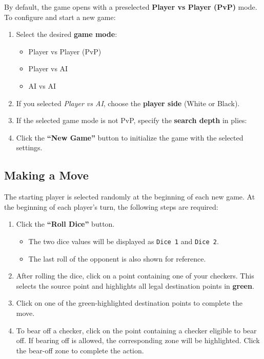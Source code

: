 By default, the game opens with a preselected \textbf{Player vs Player (PvP)} mode. To configure and start a new game:

\begin{enumerate}
    \item Select the desired \textbf{game mode}:
    \begin{itemize}
        \item Player vs Player (PvP)
        \item Player vs AI
        \item AI vs AI
    \end{itemize}

    \item If you selected \emph{Player vs AI}, choose the \textbf{player side} (White or Black).

    \item If the selected game mode is not PvP, specify the \textbf{search depth} in plies:

    \item Click the \textbf{``New Game''} button to initialize the game with the selected settings.
\end{enumerate}

\subsection*{Making a Move}
The starting player is selected randomly at the beginning of each new game.
At the beginning of each player's turn, the following steps are required:

\begin{enumerate}
    \item Click the \textbf{``Roll Dice''} button.
    \begin{itemize}
        \item The two dice values will be displayed as \texttt{Dice 1} and \texttt{Dice 2}.
        \item The last roll of the opponent is also shown for reference.
    \end{itemize}

    \item After rolling the dice, click on a point containing one of your checkers. This selects the source point and highlights all legal destination points in \textbf{green}.

    \item Click on one of the green-highlighted destination points to complete the move.

    \item To bear off a checker, click on the point containing a checker eligible to bear off. If bearing off is allowed, the corresponding zone will be highlighted. Click the bear-off zone to complete the action.
\end{enumerate}

